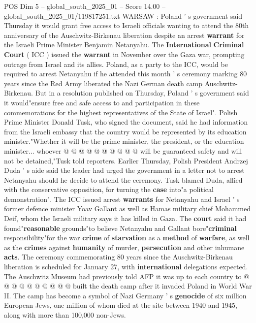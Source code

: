 \begin{textsample}{POS Dim 5 – global\_south\_2025\_01 – Score 14.00 – global\_south\_2025\_01/119817251.txt}  \label{ex:f5_pos_299}
WARSAW : Poland ' s government said Thursday it would grant free access to Israeli officials wanting to attend the 80th anniversary of the Auschwitz-Birkenau liberation despite an arrest \textbf{warrant} for the Israeli Prime Minister Benjamin Netanyahu.
The \textbf{International} \textbf{Criminal} \textbf{Court} ( ICC ) issued the \textbf{warrant} in November over the Gaza war, prompting outrage from Israel and its allies.
Poland, as a party to the ICC, would be required to arrest Netanyahu if he attended this month ' s ceremony marking 80 years since the Red Army liberated the Nazi German death camp Auschwitz-Birkenau.
But in a resolution published on Thursday, Poland ' s government said it would"ensure free and safe access to and participation in these commemorations for the highest representatives of the State of Israel".
Polish Prime Minister Donald Tusk, who signed the document, said he had information from the Israeli embassy that the country would be represented by its education minister."Whether it will be the prime minister, the president, or the education minister... whoever @ @ @ @ @ @ @ @ @ @ will be guaranteed safety and will not be detained,"Tusk told reporters.
Earlier Thursday, Polish President Andrzej Duda ' s aide said the leader had urged the government in a letter not to arrest Netanyahu should he decide to attend the ceremony.
Tusk blamed Duda, allied with the conservative opposition, for turning the \textbf{case} into"a political demonstration".
The ICC issued arrest \textbf{warrants} for Netanyahu and Israel ' s former defence minister Yoav Gallant as well as Hamas military chief Mohammed Deif, whom the Israeli military says it has killed in Gaza.
The \textbf{court} said it had found"\textbf{reasonable} grounds"to believe Netanyahu and Gallant bore"\textbf{criminal} responsibility"for the war \textbf{crime} of \textbf{starvation} as a \textbf{method} of \textbf{warfare}, as well as the \textbf{crimes} against \textbf{humanity} of murder, \textbf{persecution} and other inhumane \textbf{acts}.
The ceremony commemorating 80 years since the Auschwitz-Birkenau liberation is scheduled for January 27, with \textbf{international} delegations expected.
The Auschwitz Museum had previously told AFP it was up to each country to @ @ @ @ @ @ @ @ @ @ built the death camp after it invaded Poland in World War II.
The camp has become a symbol of Nazi Germany ' s \textbf{genocide} of six million European Jews, one million of whom died at the site between 1940 and 1945, along with more than 100,000 non-Jews.

\end{textsample}
